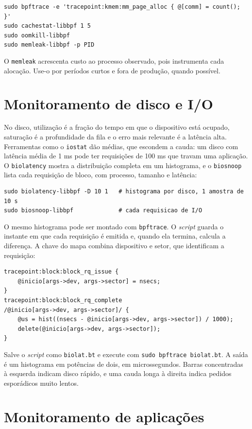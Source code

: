 \begin{lstlisting}
sudo bpftrace -e 'tracepoint:kmem:mm_page_alloc { @[comm] = count(); }'
sudo cachestat-libbpf 1 5
sudo oomkill-libbpf
sudo memleak-libbpf -p PID
\end{lstlisting}

O \texttt{memleak} acrescenta custo ao processo observado, pois instrumenta cada alocação. Use-o por períodos curtos e fora de produção, quando possível.

\section{Monitoramento de disco e I/O}

No disco, utilização é a fração do tempo em que o dispositivo está ocupado, saturação é a profundidade da fila e o erro mais relevante é a latência alta. Ferramentas como o \texttt{iostat} dão médias, que escondem a cauda: um disco com latência média de 1 ms pode ter requisições de 100 ms que travam uma aplicação. O \texttt{biolatency} mostra a distribuição completa em um histograma, e o \texttt{biosnoop} lista cada requisição de bloco, com processo, tamanho e latência:

\begin{lstlisting}
sudo biolatency-libbpf -D 10 1   # histograma por disco, 1 amostra de 10 s
sudo biosnoop-libbpf             # cada requisicao de I/O
\end{lstlisting}

O mesmo histograma pode ser montado com \texttt{bpftrace}. O \textit{script} guarda o instante em que cada requisição é emitida e, quando ela termina, calcula a diferença. A chave do mapa combina dispositivo e setor, que identificam a requisição:

\begin{lstlisting}
tracepoint:block:block_rq_issue {
    @inicio[args->dev, args->sector] = nsecs;
}
tracepoint:block:block_rq_complete
/@inicio[args->dev, args->sector]/ {
    @us = hist((nsecs - @inicio[args->dev, args->sector]) / 1000);
    delete(@inicio[args->dev, args->sector]);
}
\end{lstlisting}

Salve o \textit{script} como \texttt{biolat.bt} e execute com \texttt{sudo bpftrace biolat.bt}. A saída é um histograma em potências de dois, em microssegundos. Barras concentradas à esquerda indicam disco rápido, e uma cauda longa à direita indica pedidos esporádicos muito lentos.

\section{Monitoramento de aplicações}

